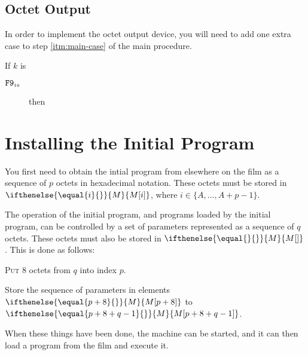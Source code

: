 \documentclass[a4paper,12pt]{article}
\newcommand{\num}[1]{\texttt{#1}}
\newcommand{\hex}[1]{\num{#1}_{\textup{\tiny 16}}}
\newcommand{\MEM}[1]{\ifthenelse{\equal{#1}{}}{M}{M[#1]}}
\newcommand{\bitno}[2]{#1.\mathrm{bit}[#2]}
\newcommand{\range}[2]{\{#1,\ldots,#2\}}
\newcommand{\proc}[1]{\textsc{#1}}
\newcommand{\deviceio}[1]{$\langle$#1$\rangle$}
\newcommand{\op}[1]{$#1$}
\theoremstyle{definition}
\newcommand{\PUTBYTE}   [1]{\op{\hex{F9}}}
\begin{document}
\subsection{Octet Output}

In order to implement the octet output device, you will need to add one extra case to step \ref{itm:main-case} of the main procedure.

\begin{stepnumbers}[start=3]
  \setcounter{enumi}{2}
\item If $k$ is
  \begin{description}
  \item[\PUTBYTE{}] then
  \end{description}
\end{stepnumbers}

\section{Installing the Initial Program}

You first need to obtain the intial program from elsewhere on the film as a sequence of $p$ octets in hexadecimal notation.
These octets must be stored in $\MEM{i}$, where $i \in \range{A}{A+p-1}$.

The operation of the initial program, and programs loaded by the initial program, can be controlled by a set of parameters represented as a sequence of $q$ octets.
These octets must also be stored in $\MEM{}$.
This is done as follows:
\begin{stepnumbers}
  \item \proc{Put} 8 octets from $q$ into index $p$.
  \item Store the sequence of parameters in elements $\MEM{p+8}$ to $\MEM{p+8+q-1}$.
\end{stepnumbers}
When these things have been done, the machine can be started, and it can then load a program from the film and execute it.
\end{document}
